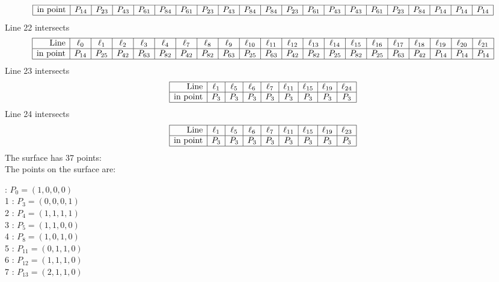 \documentclass{article}
\begin{document}
{$$\begin{array}{|r*{20}{|c}|}
\hline
\mbox{in point}  & P_{14} & P_{23} & P_{43} & P_{61} & P_{84} & P_{61} & P_{23} & P_{43} & P_{84} & P_{84} & P_{23} & P_{61} & P_{43} & P_{43} & P_{61} & P_{23} & P_{84} & P_{14} & P_{14} & P_{14}\\
\hline
\end{array}
$$
Line 22 intersects 
$$
\begin{array}{|r*{20}{|c}|}
\hline
\mbox{Line}  & \ell_{0} & \ell_{1} & \ell_{2} & \ell_{3} & \ell_{4} & \ell_{7} & \ell_{8} & \ell_{9} & \ell_{10} & \ell_{11} & \ell_{12} & \ell_{13} & \ell_{14} & \ell_{15} & \ell_{16} & \ell_{17} & \ell_{18} & \ell_{19} & \ell_{20} & \ell_{21}\\
\hline
\mbox{in point}  & P_{14} & P_{25} & P_{42} & P_{63} & P_{82} & P_{42} & P_{82} & P_{63} & P_{25} & P_{63} & P_{42} & P_{82} & P_{25} & P_{82} & P_{25} & P_{63} & P_{42} & P_{14} & P_{14} & P_{14}\\
\hline
\end{array}
$$
Line 23 intersects 
$$
\begin{array}{|r*{8}{|c}|}
\hline
\mbox{Line}  & \ell_{1} & \ell_{5} & \ell_{6} & \ell_{7} & \ell_{11} & \ell_{15} & \ell_{19} & \ell_{24}\\
\hline
\mbox{in point}  & P_{3} & P_{3} & P_{3} & P_{3} & P_{3} & P_{3} & P_{3} & P_{3}\\
\hline
\end{array}
$$
Line 24 intersects 
$$
\begin{array}{|r*{8}{|c}|}
\hline
\mbox{Line}  & \ell_{1} & \ell_{5} & \ell_{6} & \ell_{7} & \ell_{11} & \ell_{15} & \ell_{19} & \ell_{23}\\
\hline
\mbox{in point}  & P_{3} & P_{3} & P_{3} & P_{3} & P_{3} & P_{3} & P_{3} & P_{3}\\
\hline
\end{array}
$$
The surface has 37 points:\\
The points on the surface are:\\
\begin{multicols}{3}
 : $P_{0}=( 1, 0, 0, 0 )$\\
1 : $P_{3}=( 0, 0, 0, 1 )$\\
2 : $P_{4}=( 1, 1, 1, 1 )$\\
3 : $P_{5}=( 1, 1, 0, 0 )$\\
4 : $P_{8}=( 1, 0, 1, 0 )$\\
5 : $P_{11}=( 0, 1, 1, 0 )$\\
6 : $P_{12}=( 1, 1, 1, 0 )$\\
7 : $P_{13}=( 2, 1, 1, 0 )$\\

\end{multicols}}
\end{document}
